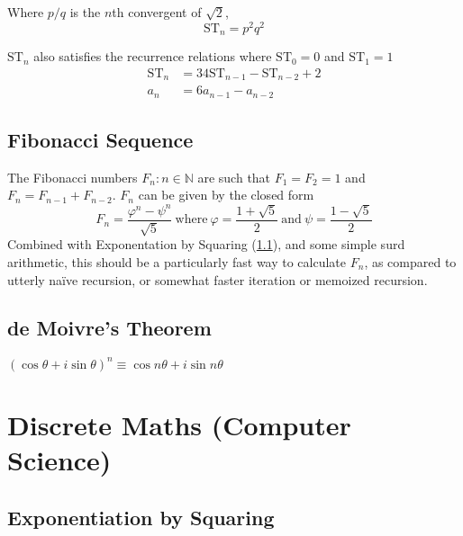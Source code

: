 \documentclass[fleqn,a4paper,11pt]{article}
\begin{document}

    Where \(p / q\) is the \(n\)th convergent of \(\sqrt 2\),
    \begin{equation}
    \mathrm{ST}_n = p^2 q^2
    \end{equation}

    \(\mathrm{ST}_n\) also satisfies the recurrence relations where
    \(\mathrm{ST}_0 = 0\) and \(\mathrm{ST}_1 = 1\)
    \begin{align}
    \mathrm{ST}_n &= 34\mathrm{ST}_{n - 1} - \mathrm{ST}_{n - 2} + 2\\
    a_n &= 6a_{n - 1} - a_{n - 2}
    \end{align}


    \subsection{Fibonacci Sequence}

    The Fibonacci numbers \(F_n: n \in \mathbb{N}\) are such that \(F_1 = F_2 = 1\)
    and \(F_n = F_{n - 1} + F_{n - 2}\).
    \(F_n\) can be given by the closed form
    \begin{equation}
    F_n = \frac{\varphi^n - \psi^n}{\sqrt 5}
    \ \text{where}\ \varphi = \frac{1 + \sqrt 5} 2
    \ \text{and}\ \psi = \frac{1 - \sqrt 5} 2
    \end{equation}
    Combined with Exponentation by Squaring (\ref{sec:exp_by_squaring}), and
    some simple surd arithmetic, this should be a particularly fast way to
    calculate \(F_n\), as compared to utterly na\"ive recursion, or somewhat
    faster iteration or memoized recursion.

    \subsection{de Moivre's Theorem}

    \((\cos \theta + i \sin \theta)^n \equiv \cos n\theta + i \sin n\theta\)

    \section{Discrete Maths (Computer Science)}

    \subsection{Exponentiation by Squaring} \label{sec:exp_by_squaring}
\end{document}
